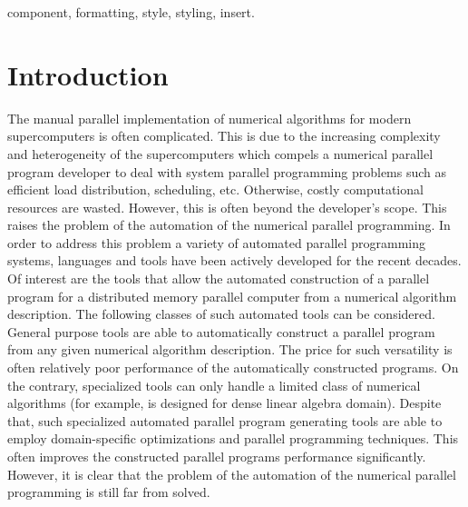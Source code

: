 \documentclass[conference]{IEEEtran}
\begin{document}
\begin{IEEEkeywords}
component, formatting, style, styling, insert.
\end{IEEEkeywords}

\section{Introduction}
The manual parallel implementation of numerical algorithms for modern supercomputers is often complicated. 
This is due to the increasing complexity and heterogeneity of the supercomputers which compels a numerical parallel 
program developer to deal with system parallel programming problems such as efficient load distribution, scheduling, etc. 
Otherwise, costly computational resources are wasted.
However, this is often beyond the developer's scope. This raises the problem of the automation of the numerical 
parallel programming. In order to address this problem a variety of automated parallel programming systems, languages 
and tools have been actively developed for the recent decades. 
Of interest are the tools that allow the automated construction of a parallel program for a distributed memory 
parallel computer from a numerical algorithm description. 
The following classes of such automated tools can be considered. General purpose tools are able to automatically 
construct a parallel program from any given numerical algorithm description. The price for such versatility is 
often relatively poor performance of the automatically constructed programs. On the contrary, specialized tools can 
only handle a limited class of numerical algorithms (for example, \cite{dplasma} is designed for dense linear algebra domain). 
Despite that, such specialized automated parallel program generating tools are able to employ 
domain-specific optimizations and parallel programming techniques. This often improves the constructed parallel 
programs performance significantly. However, it is clear that the problem of the automation of the numerical 
parallel programming is still far from solved.
\end{document}
